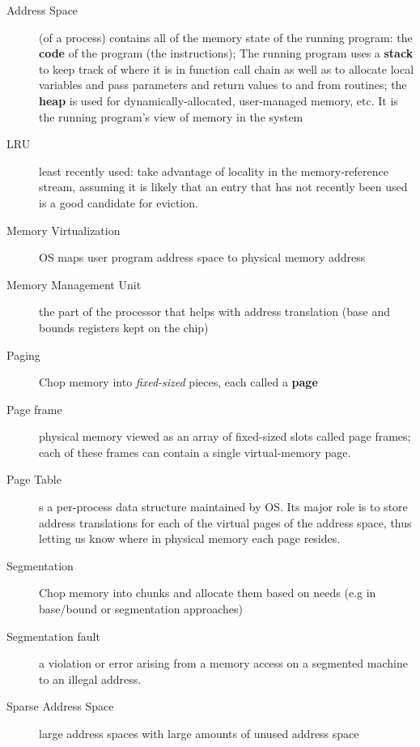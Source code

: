 \begin{description}
\item[Address Space] (of a process) contains all of the memory state of the
running program: the \textbf{code} of the program (the instructions); The running program uses a \textbf{stack} to keep track of where it is in function call chain as well as to allocate local variables and pass parameters and return values to and from routines; the \textbf{heap} is used for dynamically-allocated, user-managed memory, etc.  It is the running program’s view of memory in the system

\item[LRU] least recently used: take advantage of locality in the memory-reference stream, assuming it is likely that an entry that has not recently been used is a good
candidate for eviction.

\item[Memory Virtualization] OS maps user program address space to physical memory address

\item[Memory Management Unit] the part of the processor that helps with address translation (base and bounds registers kept on the chip)

\item[Paging] Chop memory into \emph{fixed-sized} pieces, each called a \textbf{page}

\item[Page frame] physical memory viewed as an array of fixed-sized slots called page frames; each of these frames can contain a single virtual-memory page.

\item[Page Table] s a per-process data structure maintained by OS.  Its major role is to store address translations for each of the virtual pages of the address space, thus letting us know where in physical memory each page resides.

\item[Segmentation] Chop memory into  chunks and allocate them based on needs (e.g in base/bound or segmentation approaches)

\item[Segmentation fault] a violation or error arising from a memory access on a segmented machine to an illegal address.

\item[Sparse Address Space] large address spaces with large amounts of unused address space


\end{description}
